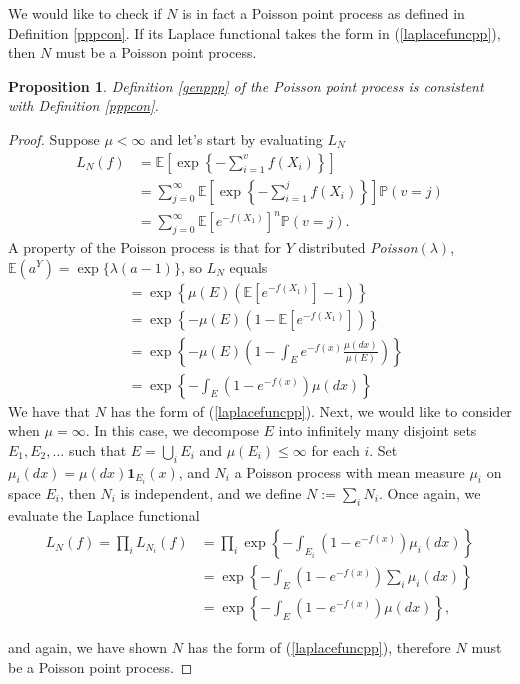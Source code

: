 \documentclass[11pt, oneside]{article}   	%
\newtheorem{proposition}{Proposition}[section]
\theoremstyle{definition}
\theoremstyle{remark}
\begin{document}
We would like to check if $N$ is in fact a Poisson point process as defined in Definition \ref{pppcon}. If its Laplace functional takes the form in (\ref{laplacefuncpp}), then $N$ must be a Poisson point process.

\begin{proposition} \label{altpppcon}
  Definition \ref{genppp} of the Poisson point process is consistent with Definition \ref{pppcon}.
\end{proposition}

\begin{proof}
  Suppose $\mu < \infty$ and let's start by evaluating $L_N$
  \begin{align*}
    L_N(f) &= \mathbb{E}\left[\exp \left\{-\sum_{i=1}^v f(X_i) \right\}\right] \\
	   &= \sum_{j=0}^\infty \mathbb{E}\left[\exp \left\{-\sum_{i=1}^j f(X_i) \right\}\right] \mathbb{P}(v = j) \\
	   &= \sum_{j=0}^\infty \mathbb{E}\left[e^{-f(X_1)}\right]^n \mathbb{P}(v = j).
  \end{align*}
  A property of the Poisson process is that for $Y$ distributed \textit{Poisson}$(\lambda)$, $\mathbb{E}(a^Y)=\exp\{\lambda(a-1)\}$, so $L_N$ equals
  \begin{align*}
	   &= \exp \left\{\mu(E)\left(\mathbb{E}\left[e^{-f(X_1)}\right]-1\right)\right\} \\
	   &= \exp \left\{-\mu(E)\left(1-\mathbb{E}\left[e^{-f(X_1)}\right]\right)\right\} \\
	   &= \exp \left\{-\mu(E)\left(1-\int_E e^{-f(x)} \frac{\mu(dx)}{\mu(E)}\right)\right\} \\
	   &= \exp \left\{-\int_E (1- e^{-f(x)}) \mu(dx)\right\}
  \end{align*}
  We have that $N$ has the form of (\ref{laplacefuncpp}). Next, we would like to consider when $\mu=\infty$. In this case, we decompose $E$ into infinitely many disjoint sets $E_1, E_2, ...$ such that $E= \bigcup_i E_i$ and $\mu(E_i) \leq \infty$ for each $i$. Set $\mu_i(dx) = \mu(dx)\mathbf{1}_{E_i}(x)$, and $N_i$ a Poisson process with mean measure $\mu_i$ on space $E_i$, then ${N_i}$ is independent, and we define $N := \sum_{i} N_i$. Once again, we evaluate the Laplace functional
  \begin{align*}
    L_N(f) = \prod_{i} L_{N_i}(f) &= \prod_{i} \exp \left\{-\int_{E_i} (1- e^{-f(x)}) \mu_i(dx)\right\} \\
	   &= \exp \left\{-\int_{E} (1- e^{-f(x)}) \sum_{i}\mu_i(dx)\right\} \\
	   &= \exp \left\{-\int_{E} (1- e^{-f(x)}) \mu(dx)\right\},
  \end{align*}

  and again, we have shown $N$ has the form of (\ref{laplacefuncpp}), therefore $N$ must be a Poisson point process.
\end{proof}
\end{document}
